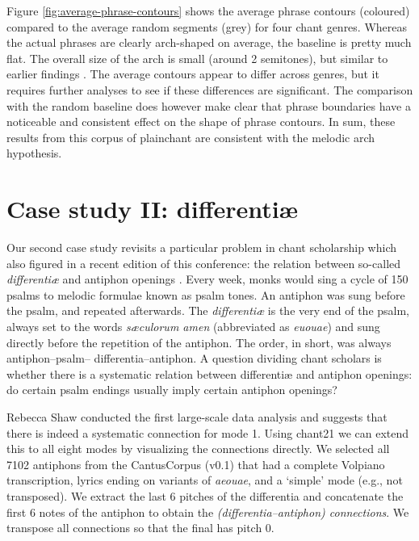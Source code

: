 \documentclass[sigconf,screen]{acmart}
\begin{document}
Figure \ref{fig:average-phrase-contours} shows the average phrase contours (coloured) compared to the average random segments (grey) for four chant genres.
Whereas the actual phrases are clearly arch-shaped on average, the baseline is pretty much flat.
The overall size of the arch is small (around 2 semitones), but similar to earlier findings \cite{Tierney2011,Savage2017a}.
The average contours appear to differ across genres, but it requires further analyses to see if these differences are significant.
The comparison with the random baseline does however make clear that phrase boundaries have a noticeable and consistent effect on the shape of phrase contours.
In sum, these results from this corpus of plainchant are consistent with the melodic arch hypothesis.




\section{Case study II: differentiæ}


Our second case study revisits a particular problem in chant scholarship which also figured in a recent edition of this conference: the relation between so-called \emph{differentiæ} and antiphon openings \cite{Shaw2018}.
Every week, monks would sing a cycle of 150 psalms to melodic formulae known as psalm tones.
An antiphon was sung before the psalm, and repeated afterwards.
The \emph{differentiæ} is the very end of the psalm, always set to the words \emph{sæculorum amen} (abbreviated as \emph{euouae}) and sung directly before the repetition of the antiphon.
The order, in short, was always antiphon--psalm-- differentia--antiphon.
A question dividing chant scholars is whether there is a systematic relation between differentiæ and antiphon openings: do certain psalm endings usually imply certain antiphon openings?

Rebecca Shaw \cite{Shaw2018} conducted the first large-scale data analysis and suggests that there is indeed a systematic connection for mode 1.
Using chant21 we can extend this to all eight modes by visualizing the connections directly.
We selected all 7102 antiphons from the CantusCorpus (v0.1) that had a complete Volpiano transcription, lyrics ending on variants of \emph{aeouae}, and a `simple' mode (e.g., not transposed).
We extract the last 6 pitches of the differentia and concatenate the first 6 notes of the antiphon to obtain the \emph{(differentia--antiphon) connections}.
We transpose all connections so that the final has pitch 0.
\end{document}
